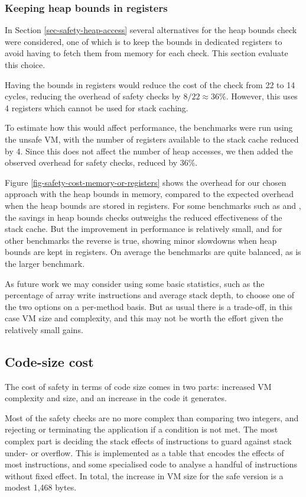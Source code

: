 \subsubsection{Keeping heap bounds in registers}
In Section \ref{sec-safety-heap-access} several alternatives for the heap bounds check were considered, one of which is to keep the bounds in dedicated registers to avoid having to fetch them from memory for each check. This section evaluate this choice.

Having the bounds in registers would reduce the cost of the check from 22 to 14 cycles, reducing the overhead of safety checks by $8/22 \approx 36\%$. However, this uses 4 registers which cannot be used for stack caching.

To estimate how this would affect performance, the benchmarks were run using the unsafe VM, with the number of registers available to the stack cache reduced by 4. Since this does not affect the number of heap accesses, we then added the observed overhead for safety checks, reduced by 36\%.

Figure \ref{fig-safety-cost-memory-or-registers} shows the overhead for our chosen approach with the heap bounds in memory, compared to the expected overhead when the heap bounds are stored in registers. For some benchmarks such as  and , the savings in heap bounds checks outweighs the reduced effectiveness of the stack cache. But the improvement in performance is relatively small, and for other benchmarks the reverse is true, showing minor slowdowns when heap bounds are kept in registers. On average the benchmarks are quite balanced, as is the larger  benchmark.

As future work we may consider using some basic statistics, such as the percentage of array write instructions and average stack depth, to choose one of the two options on a per-method basis. But as usual there is a trade-off, in this case VM size and complexity, and this may not be worth the effort given the relatively small gains.

\subsection{Code-size cost}
The cost of safety in terms of code size comes in two parts: increased VM complexity and size, and an increase in the code it generates.

Most of the safety checks are no more complex than comparing two integers, and rejecting or terminating the application if a condition is not met. The most complex part is deciding the stack effects of instructions to guard against stack under- or overflow. This is implemented as a table that encodes the effects of most instructions, and some specialised code to analyse a handful of instructions without fixed effect. In total, the increase in VM size for the safe version is a modest 1,468 bytes.

